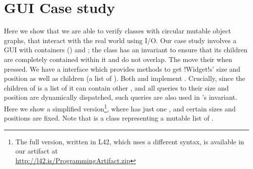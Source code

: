 \section{GUI Case study}
\label{s:case-study}
\saveSpace

%
%
%
%
%
%
%
Here we show that we are able to verify classes with circular mutable object graphs, that interact with the real world using I/O.
Our case study involves a GUI with containers (\Q@SafeMovable@s) and \Q@Button@s;
the \Q@SafeMovable@ class has an invariant to ensure that its children are completely contained within it and do not overlap. The \Q@Button@s move their \Q@SafeMovable@ when pressed. We have a \Q@Widget@ interface which provides methods to get \Q!Widget!s' size and position as well as children (a list of \Q@Widget@s). Both \Q@SafeMovable@s and \Q@Button@s implement \Q@Widget@. Crucially, since the children of \Q@SafeMovable@ is a list of \Q@Widget@s it can contain other \Q@SafeMovable@s, and all queries to their size and position are dynamically dispatched, such queries are also used in \Q@SafeMovable@'s invariant.
Here we show a simplified version\footnote{The full version, written in L42, which uses a different syntax, is available in our artifact at\\ \url{http://l42.is/ProgrammingArtifact.zip} }, where  \Q@SafeMovable@ has just one \Q@Button@, and certain sizes and positions are fixed. Note that \Q@Widgets@ is a class representing a mutable list of \Q@mut@ \Q@Widget@s.

